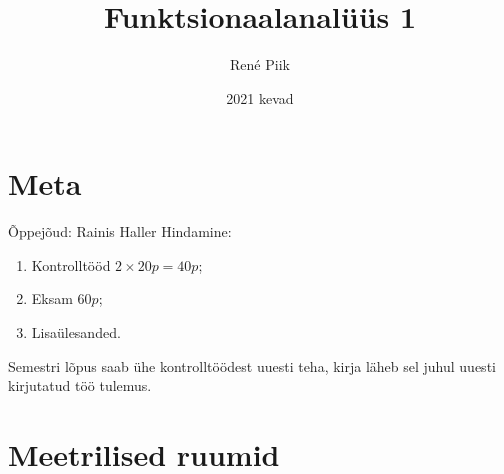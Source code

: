 \documentclass{article}[12pt]
\theoremstyle{definition}
\theoremstyle{definition}
\begin{document}
\title{Funktsionaalanalüüs 1}
\author{René Piik}
\date{2021 kevad}

\maketitle

\section*{Meta}

Õppejõud: Rainis Haller \newline
Hindamine:
\begin{enumerate}
	\item Kontrolltööd $2\times 20p = 40p$;
	\item Eksam $60p$;
	\item Lisaülesanded.
\end{enumerate}
Semestri lõpus saab ühe kontrolltöödest uuesti teha, kirja läheb sel juhul uuesti kirjutatud töö tulemus.

\tableofcontents
\newpage

\section{Meetrilised ruumid}
\end{document}
